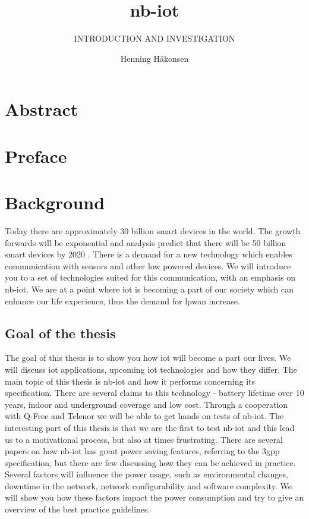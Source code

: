 \documentclass[USenglish]{ifimaster}  %
\title{\acrlong{nb-iot}}        %
\subtitle{INTRODUCTION AND INVESTIGATION}         %
\author{Henning Håkonsen}             %
\begin{document}
\duoforside[dept={Department of Informatics},   %
  program={Network and system administration},  %
  long]                                        %

\frontmatter{}
\chapter*{Abstract}                   %

\tableofcontents

\cleardoublepage
\lstlistoflistings

\cleardoublepage
\listoffigures

\listoftables{}

\chapter*{Preface}                    %

\mainmatter{}

\chapter{Background}                  %
Today there are approximately 30 billion smart devices in the world. The growth forwards will be exponential and analysis predict that there will be 50 billion smart devices by 2020 \cite{online:IoT2020}. There is a demand for a new technology which enables communication with sensors and other low powered devices. We will introduce you to a set of technologies suited for this communication, with an emphasis on \acrfull{nb-iot}. We are at a point where \acrshort{iot} is becoming a part of our society which can enhance our life experience, thus the demand for \acrfull{lpwan} increase.

\section{Goal of the thesis}
The goal of this thesis is to show you how \acrshort{iot} will become a part our lives. We will discuss \acrshort{iot} applications, upcoming \acrshort{iot} technologies and how they differ. The main topic of this thesis is \acrshort{nb-iot} and how it performs concerning its specification. There are several claims to this technology - battery lifetime over 10 years, indoor and underground coverage and low cost. Through a cooperation with Q-Free and Telenor we will be able to get hands on tests of \acrshort{nb-iot}. The interesting part of this thesis is that we are the first to test \acrshort{nb-iot} and this lead us to a motivational process, but also at times frustrating. There are several papers on how \acrshort{nb-iot} has great power saving features, referring to the \acrshort{3gpp} specification, but there are few discussing how they can be achieved in practice. Several factors will influence the power usage, such as environmental changes, downtime in the network, network configurability and software complexity. We will show you how these factors impact the power consumption and try to give an overview of the best practice guidelines.
\end{document}
